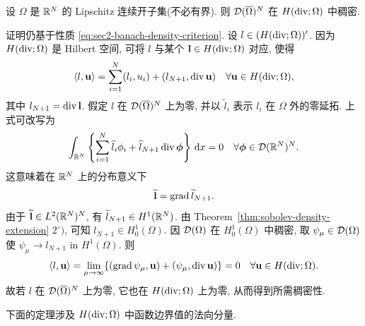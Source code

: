 \setcounter{statement}{3}
\begin{Theorem}\label{thm:sec2-dense-in-hdiv}
设 $\Omega$ 是 $\mathbb{R}^N$ 的 Lipschitz 连续开子集(不必有界). 则
$\mathcal{D}(\overline\Omega)^N$ 在 $H(\operatorname{div};\Omega)$ 中稠密.
\end{Theorem}
\begin{Proof}
证明仍基于性质 \eqref{eq:sec2-banach-density-criterion}. 设
$l\in(H(\operatorname{div};\Omega))'$. 因为 $H(\operatorname{div};\Omega)$ 是 Hilbert 空间, 可将 $l$
与某个 $\mathbf l\in H(\operatorname{div};\Omega)$ 对应, 使得
\[
  \langle l,\mathbf u\rangle
  =\sum_{i=1}^{N}(l_i,u_i)+(l_{N+1},\operatorname{div}\mathbf u)
  \quad\forall\mathbf u\in H(\operatorname{div};\Omega),
\]
其中 $l_{N+1}=\operatorname{div}\mathbf l$. 假定 $l$ 在 $\mathcal{D}(\overline\Omega)^N$ 上为零,
并以 $\widetilde l_i$ 表示 $l_i$ 在 $\Omega$ 外的零延拓. 上式可改写为
\[
  \int_{\mathbb{R}^N}\left\{\sum_{i=1}^{N}\widetilde l_i\phi_i
  +\widetilde l_{N+1}\operatorname{div}\boldsymbol\phi\right\}\,\mathrm{d} x=0
  \quad\forall\boldsymbol\phi\in\mathcal{D}(\mathbb{R}^N)^N.
\]
这意味着在 $\mathbb{R}^N$ 上的分布意义下
\[
  \widetilde{\mathbf l}=\operatorname{grad}\widetilde l_{N+1}.
\]
由于 $\widetilde{\mathbf l}\in L^2(\mathbb{R}^N)^N$, 有
$\widetilde l_{N+1}\in H^1(\mathbb{R}^N)$. 由
Theorem~\ref{thm:sobolev-density-extension} $2^\circ)$, 可知
$l_{N+1}\in H_0^1(\Omega)$. 因 $\mathcal{D}(\Omega)$ 在 $H_0^1(\Omega)$ 中稠密,
取 $\psi_\mu\in\mathcal{D}(\Omega)$ 使 $\psi_\mu\to l_{N+1}$ in $H^1(\Omega)$. 则
\[
  \langle l,\mathbf u\rangle
  =\lim_{\mu\to\infty}\{(\operatorname{grad}\psi_\mu,\mathbf u)
  +(\psi_\mu,\operatorname{div}\mathbf u)\}=0
  \quad\forall\mathbf u\in H(\operatorname{div};\Omega).
\]
故若 $l$ 在 $\mathcal{D}(\overline\Omega)^N$ 上为零, 它也在 $H(\operatorname{div};\Omega)$ 上为零,
从而得到所需稠密性.
\end{Proof}

下面的定理涉及 $H(\operatorname{div};\Omega)$ 中函数边界值的法向分量.


